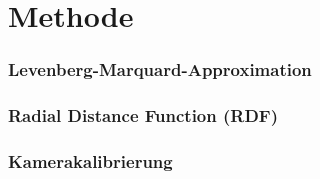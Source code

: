 \section{Methode}

\subsubsection{Levenberg-Marquard-Approximation}
\subsubsection{Radial Distance Function (RDF)}
\subsubsection{Kamerakalibrierung}


